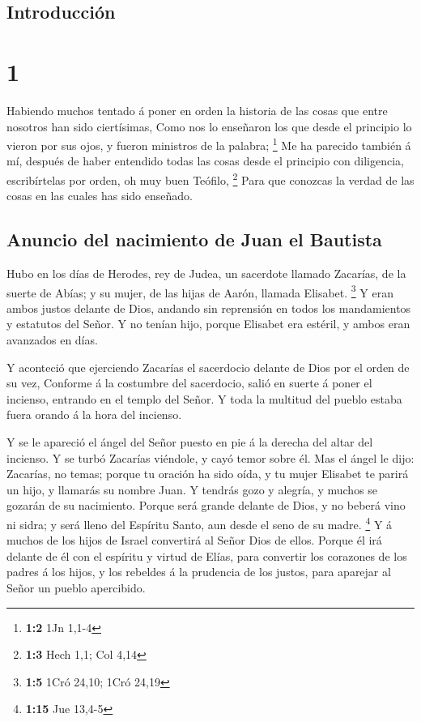\hypertarget{introducciuxf3n}{%
\subsection{Introducción}\label{introducciuxf3n}}

\hypertarget{section}{%
\section{1}\label{section}}

 Habiendo muchos tentado á poner en orden la historia de las
cosas que entre nosotros han sido ciertísimas,  Como nos lo
enseñaron los que desde el principio lo vieron por sus ojos, y fueron
ministros de la palabra; \footnote{\textbf{1:2} 1Jn 1,1-4} 
Me ha parecido también á mí, después de haber entendido todas las cosas
desde el principio con diligencia, escribírtelas por orden, oh muy buen
Teófilo, \footnote{\textbf{1:3} Hech 1,1; Col 4,14}  Para
que conozcas la verdad de las cosas en las cuales has sido enseñado.

\hypertarget{anuncio-del-nacimiento-de-juan-el-bautista}{%
\subsection{Anuncio del nacimiento de Juan el
Bautista}\label{anuncio-del-nacimiento-de-juan-el-bautista}}

 Hubo en los días de Herodes, rey de Judea, un sacerdote
llamado Zacarías, de la suerte de Abías; y su mujer, de las hijas de
Aarón, llamada Elisabet. \footnote{\textbf{1:5} 1Cró 24,10; 1Cró 24,19}
 Y eran ambos justos delante de Dios, andando sin reprensión
en todos los mandamientos y estatutos del Señor.  Y no
tenían hijo, porque Elisabet era estéril, y ambos eran avanzados en
días.

 Y aconteció que ejerciendo Zacarías el sacerdocio delante
de Dios por el orden de su vez,  Conforme á la costumbre del
sacerdocio, salió en suerte á poner el incienso, entrando en el templo
del Señor.  Y toda la multitud del pueblo estaba fuera
orando á la hora del incienso.

 Y se le apareció el ángel del Señor puesto en pie á la
derecha del altar del incienso.  Y se turbó Zacarías
viéndole, y cayó temor sobre él.  Mas el ángel le dijo:
Zacarías, no temas; porque tu oración ha sido oída, y tu mujer Elisabet
te parirá un hijo, y llamarás su nombre Juan.  Y tendrás
gozo y alegría, y muchos se gozarán de su nacimiento. 
Porque será grande delante de Dios, y no beberá vino ni sidra; y será
lleno del Espíritu Santo, aun desde el seno de su madre. \footnote{\textbf{1:15}
  Jue 13,4-5}  Y á muchos de los hijos de Israel convertirá
al Señor Dios de ellos.  Porque él irá delante de él con el
espíritu y virtud de Elías, para convertir los corazones de los padres á
los hijos, y los rebeldes á la prudencia de los justos, para aparejar al
Señor un pueblo apercibido.

